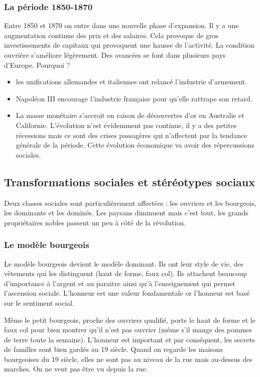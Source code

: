 \documentclass[12pt]{report}
\begin{document}
\subsubsection{La période 1850-1870}

Entre 1850 et 1870 on entre dans une nouvelle phase d’expansion. Il y a une augmentation
continue des prix et des salaires. Cela provoque de gros investissements de capitaux qui
provoquent une hausse de l’activité. La condition ouvrière s’améliore légèrement. Des
avancées se font dans plusieurs pays d’Europe. Pourquoi ?

\begin{itemize}
\item les unifications allemandes et italiennes ont relancé l’industrie d’armement.
\item Napoléon III encourage l’industrie française pour qu’elle rattrape son retard.
\item La masse monétaire s’accroit en raison de découvertes d’or en Australie et Californie.
	L’évolution n’est évidemment pas continue, il y a des petites récessions mais ce sont des
crises passagères qui n’affectent par la tendance générale de la période. Cette évolution
économique va avoir des répercussions sociales.
\end{itemize}

\subsection{Transformations sociales et stéréotypes sociaux}

Deux classes sociales sont particulièrement affectées : les ouvriers et les bourgeois, les
dominants et les dominés. Les paysans diminuent mais c’est tout, les grands propriétaires
nobles passent un peu à côté de la révolution.

\subsubsection{Le modèle bourgeois}

Le modèle bourgeois devient le modèle dominant. Ils ont leur style de vie, des vêtements qui
les distinguent (haut de forme, faux col). Ils attachent beaucoup d’importance à l’argent et au
paraitre ainsi qu’à l’enseignement qui permet l’ascension sociale. L’honneur est une valeur
fondamentale or l’honneur est basé sur le sentiment social.

Même le petit bourgeois, proche des ouvriers qualifié, porte le haut de forme et le faux col
pour bien montrer qu’il n’est pas ouvrier (même s’il mange des pommes de terre toute la
semaine). L’honneur est important et par conséquent, les secrets de familles sont bien gardés
au 19 siècle. Quand on regarde les maisons bourgeoises du 19 siècle, elles ne sont pas au
niveau de la rue mais au-dessus des marches. On ne veut pas être vu depuis la rue.
\end{document}

